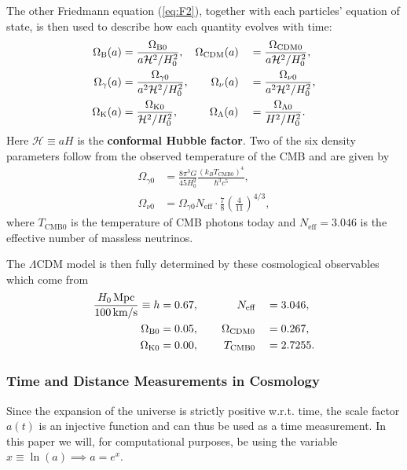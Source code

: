 \documentclass[%
reprint,
 amsmath,amssymb,
 aps,
]{revtex4-2}
\newcommand{\Hp}{\mathcal{H}}
\begin{document}
The other Friedmann equation (\ref{eq:F2}), together with each particles' equation of state, is then used to describe how each quantity evolves with time:
\begin{alignat}{2}
	\Omega_{\text B}(a)&=\frac{\Omega_{\text B0}}{a\Hp^2/H_0^2},\hspace{3.5mm}\Omega_{\text{CDM}}(a)&&=\frac{\Omega_{\text{CDM}0}}{a\Hp^2/H_0^2},\nonumber\\
	\Omega_{\gamma}(a)&=\frac{\Omega_{\gamma0}}{a^2\Hp^2/H_0^2},\hspace{7mm}\Omega_{\nu}(a)&&=\frac{\Omega_{\nu0}}{a^2\Hp^2/H_0^2},\label{eq:Omegai}\\
	\Omega_{\text K}(a)&=\frac{\Omega_{\text K0}}{\Hp^2/H_0^2},\hspace{10mm}\Omega_{\Lambda}(a)&&=\frac{\Omega_{\Lambda0}}{H^2/H_0^2}.\nonumber
\end{alignat}
Here $\Hp\equiv aH$ is the \textbf{conformal Hubble factor}. Two of the six density parameters follow from the observed temperature of the CMB and are given by
\begin{align}
	\label{eq:ORad}
	\Omega_{\gamma0}&=\frac{8\pi^3 G}{45 H_0^2}\frac{(k_BT_{\text{CMB}0})^4}{\hbar^3 c^5},\\
	\label{eq:ONu}
	\Omega_{\nu0}&=\Omega_{\gamma0}N_{\text{eff}}\cdot\frac{7}{8}\left(\frac{4}{11}\right)^{4/3},
\end{align}
where $T_{\text{CMB}0}$ is the temperature of CMB photons today and $N_{\text{eff}}=3.046$ is the effective number of massless neutrinos. \cite{Planck:2018vyg}

The $\Lambda$CDM model is then fully determined by these cosmological observables which come from \cite{Planck:2018vyg}
\begin{alignat}{2}
	\frac{H_0\,\text{Mpc}}{100\,\text{km/s}}\equiv h &= 0.67,\hspace{12.2mm}N_\text{eff}&&=3.046,\nonumber\\
	\Omega_{\text B0}&=0.05,\hspace{7.3mm}\Omega_{\text{CDM}0}&&=0.267,\label{eq:planck_data}\\
	\Omega_{\text K0}&=0.00,\hspace{8mm}T_{\text{CMB}0}&&=2.7255.\nonumber
\end{alignat}
\subsubsection{Time and Distance Measurements in Cosmology}
Since the expansion of the universe is strictly positive w.r.t. time, the scale factor $a(t)$ is an injective function and can thus be used as a time measurement. In this paper we will, for computational purposes, be using the variable $x\equiv\ln(a)\implies a=e^x$. 
\end{document}
